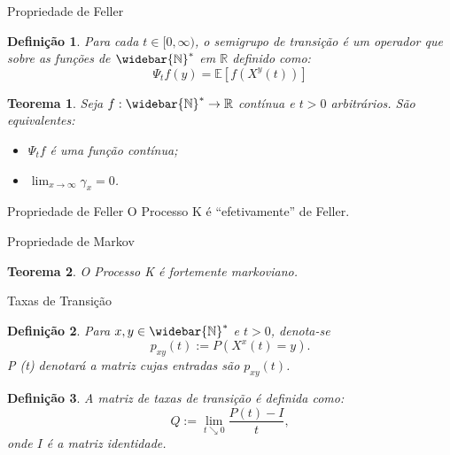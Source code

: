 \documentclass[xcolor=pdftex,dvipsnames]{beamer}
\newcommand{\Nzb}{{\mathbb{\widebar{N}^*}}}
\newcommand{\R}{{\mathbb{R}}}
\newcommand{\E}{{\mathbb{E}}}
\newtheorem{teorema}{Teorema}
\newtheorem{definicao}{Definição}
\begin{document}
\begin{frame}{Propriedade de Feller}

  \begin{definicao}
    Para cada $t \in [0, \infty)$, o semigrupo de transição é um
    operador que sobre as funções de $\Nzb$ em $\R$ definido como:
    \begin{displaymath}
      \Psi_t f (y) = \E \left[ f(X^y(t)) \right]
    \end{displaymath}
  \end{definicao} \pause

  \begin{teorema}
    Seja $f: \Nzb \to \R$ contínua e $t > 0$ arbitrários. São
    equivalentes:
    \begin{itemize}
    \item $\Psi_t f$ é uma função contínua;
    \item $\displaystyle \lim_{x \to \infty} \gamma_x = 0$.
    \end{itemize}
  \end{teorema}
\end{frame}

\begin{frame}{Propriedade de Feller}
  O Processo K é ``efetivamente'' de Feller.
\end{frame}

\begin{frame}{Propriedade de Markov}
  \begin{teorema}
    O Processo K é fortemente markoviano.
  \end{teorema}
\end{frame}


\begin{frame}{Taxas de Transição}
  \begin{definicao}
    Para $x, y \in \Nzb$ e $t > 0$, denota-se
    \begin{displaymath}
      p_{x y} (t) := P \left( X^x(t) = y \right).
    \end{displaymath}
    P (t) denotará a matriz cujas entradas são $p_{x y} (t)$.
  \end{definicao} \pause
  \begin{definicao}
    A matriz de taxas de transição é definida como:
    \begin{displaymath}
      Q := \lim_{t \searrow 0} \frac{P(t) - I}{t},
    \end{displaymath}
    onde $I$ é a matriz identidade.
  \end{definicao}
\end{frame}
\end{document}
